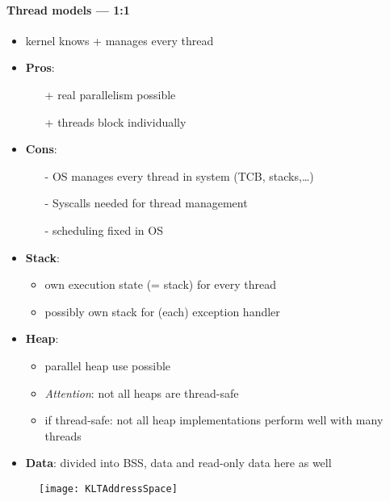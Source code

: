 \paragraph{Thread models --- 1:1}
\begin{itemize}
  \item kernel knows + manages every thread
  \item \textbf{Pros}:
  \begin{itemize}
    \item[+] real parallelism possible
    \item[+] threads block individually
  \end{itemize}
  \item \textbf{Cons}:
  \begin{itemize}
    \item[-] OS manages every thread in system (TCB, stacks,\dots)
    \item[-] Syscalls needed for thread management
    \item[-] scheduling fixed in OS
  \end{itemize}
  \item \textbf{Stack}:
  \begin{itemize}
    \item own execution state (= stack) for every thread
    \item possibly own stack for (each) exception handler
  \end{itemize}
  \item \textbf{Heap}:
  \begin{itemize}
    \item parallel heap use possible
    \item \emph{Attention}: not all heaps are thread-safe
    \item if thread-safe: not all heap implementations perform well with many threads
  \end{itemize}
  \item \textbf{Data}: divided into BSS, data and read-only data here as well
\end{itemize}
\begin{figure}[h]\centering\label{KLTAddressSpace}\texttt{[image: KLTAddressSpace]}\end{figure}

